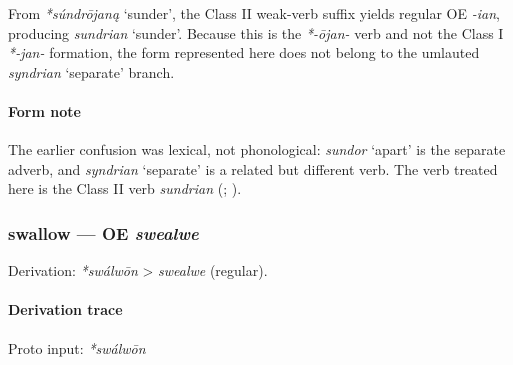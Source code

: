 \documentclass[
  british,
  a4paper,
]{article}
\providecommand{\Recon}[1]{\emph{*#1}}
\begin{document}
From \Recon{súndrōjaną} `sunder', the Class II weak-verb suffix yields
regular OE \emph{-ian}, producing \emph{sundrian} `sunder'. Because this
is the \emph{*-ōjan-} verb and not the Class I \emph{*-jan-} formation,
the form represented here does not belong to the umlauted
{\emph{syndrian}} `separate' branch.

\paragraph{Form note}\label{form-note-21}

The earlier confusion was lexical, not phonological: {\emph{sundor}}
`apart' is the separate adverb, and {\emph{syndrian}} `separate' is a
related but different verb. The verb treated here is the Class II verb
\emph{sundrian} (;
).

\subsubsection{\texorpdfstring{swallow --- OE
\emph{swealwe}}{swallow --- OE swealwe}}\label{swallow-oe-swealwe}

Derivation: \emph{*swálwōn} \textgreater{} \emph{swealwe} (regular).

\paragraph{Derivation trace}\label{derivation-trace-80}

Proto input: \emph{*swálwōn}

\begingroup
\setlength{\fboxsep}{6pt}
\end{document}
